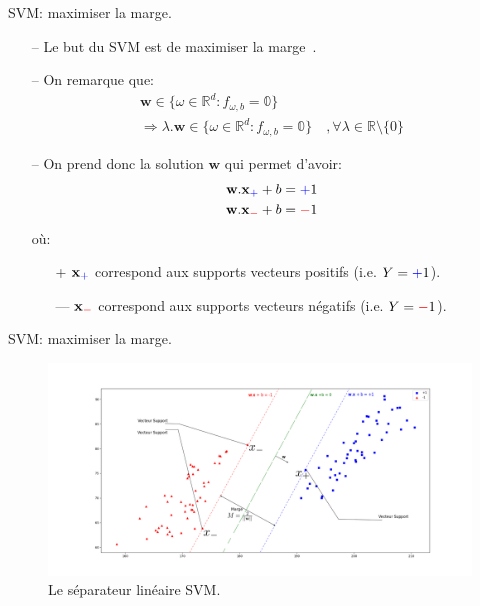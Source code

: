 \documentclass[9pt]{beamer}
\begin{document}
	\begin{frame}{SVM\@: maximiser la marge.}
		\begin{itemize}
			\item[--] Le but du SVM est de maximiser la marge~\cite{vapnik1998statistical}.
			\item[--] On remarque que:
			\begin{gather*}
				\textbf{w} \in \{\omega \in \mathbb{R}^d : f_{\omega, b} = \mathbb{0}\} \\
				\Rightarrow
				\lambda . \textbf{w} \in \{\omega \in \mathbb{R}^d : f_{\omega, b} = \mathbb{0}\}\quad, \forall \lambda \in \mathbb{R}\setminus\{0\}
			\end{gather*}
			\item[--] On prend donc la solution $\textbf{w}$ qui permet d'avoir:
			\begin{align}
				\textbf{w}.\textbf{x}_{\color{blue}+} + b &= {\color{blue}+}1 \\
				\textbf{w}.\textbf{x}_{\color{red}-} + b &= {\color{red}-}1
			\end{align}
			où:
			\begin{itemize}
				\item[{\color{blue}+}] $\textbf{x}_{\color{blue}+}$ correspond aux supports vecteurs positifs (i.e. $Y={\color{blue}+}1$).
				\item[{\color{red}---}] $\textbf{x}_{\color{red}-}$ correspond aux supports vecteurs négatifs (i.e. $Y={\color{red}-}1$).
			\end{itemize}
		\end{itemize}
	\end{frame}

	\begin{frame}{SVM\@: maximiser la marge.}
		\begin{figure}[H]
			\includegraphics[width=\textwidth]{svm_margin}
			\caption{\label{fig::margin} Le séparateur linéaire SVM.}
		\end{figure}
	\end{frame}
\end{document}
